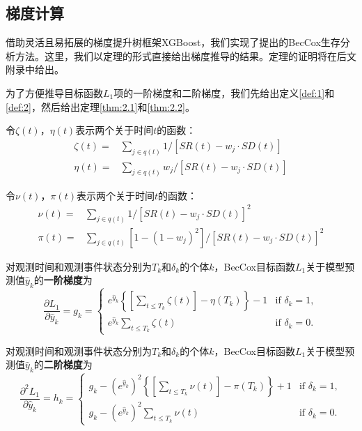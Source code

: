 \subsection{梯度计算}

借助灵活且易拓展的梯度提升树框架XGBoost，我们实现了提出的BecCox生存分析方法。这里，我们以定理的形式直接给出梯度推导的结果。定理的证明将在后文附录中给出。
    
为了方便推导目标函数$L_1$项的一阶梯度和二阶梯度，我们先给出定义\ref{def:1}和\ref{def:2}，然后给出定理\ref{thm:2.1}和\ref{thm:2.2}。

\begin{definition}\label{def:1}
令$\zeta(t)$，$\eta(t)$表示两个关于时间$t$的函数：\[
\begin{split}
\zeta(t) =& \sum_{j\in q(t)} 1/[SR(t) - w_j\cdot SD(t)] \\
\eta(t)  =& \sum_{j\in q(t)} w_j/[SR(t) - w_j\cdot SD(t)]
\end{split}
\]
\end{definition}

\begin{definition}\label{def:2}
令$\nu(t)$，$\pi(t)$表示两个关于时间$t$的函数：\[
\begin{split}
\nu(t) =& \sum_{j\in q(t)} 1/[SR(t) - w_j\cdot SD(t)]^2 \\
\pi(t)  =& \sum_{j\in q(t)} [1-(1-w_j)^2]/[SR(t) - w_j\cdot SD(t)]^2
\end{split}
\]
\end{definition}

\begin{theorem}\label{thm:2.1}
对观测时间和观测事件状态分别为$T_k$和$\delta_k$的个体$k$，BecCox目标函数$L_1$关于模型预测值$\hat{y}_k$的\textbf{一阶梯度}为$$
\frac{\partial L_1}{\partial \hat{y}_k} = g_k = 
\begin{cases}
e^{\hat{y}_k} \left\{ \left[\sum_{t\le T_k} \zeta(t)\right] - \eta(T_k) \right\} - 1 & \text{if } \delta_k = 1,\\
e^{\hat{y}_k} \sum_{t\le T_k} \zeta(t) & \text{if } \delta_k = 0.
\end{cases}
$$
\end{theorem}

\begin{theorem}\label{thm:2.2}
对观测时间和观测事件状态分别为$T_k$和$\delta_k$的个体$k$，BecCox目标函数$L_1$关于模型预测值$\hat{y}_k$的\textbf{二阶梯度}为$$
\frac{\partial^2 L_1}{\partial \hat{y}_k} = h_k = 
\begin{cases}
g_k - (e^{\hat{y}_k})^2 \left\{ \left[\sum_{t\le T_k} \nu(t)\right] - \pi(T_k) \right\} + 1 & \text{if } \delta_k = 1,\\
g_k - (e^{\hat{y}_k})^2 \sum_{t\le T_k} \nu(t) & \text{if } \delta_k = 0.
\end{cases}
$$
\end{theorem}

